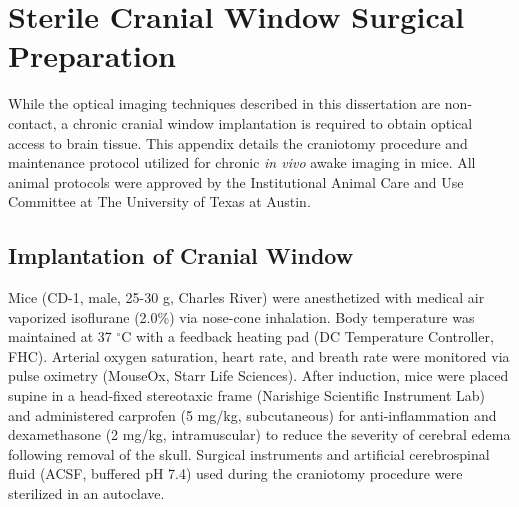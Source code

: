 
\chapter{Sterile Cranial Window Surgical Preparation} \label{app:cranial_window}

While the optical imaging techniques described in this dissertation are non-contact, a chronic cranial window implantation is required to obtain optical access to brain tissue. This appendix details the craniotomy procedure and maintenance protocol utilized for chronic \textit{in vivo} awake imaging in mice. All animal protocols were approved by the Institutional Animal Care and Use Committee at The University of Texas at Austin.


\section{Implantation of Cranial Window}

Mice (CD-1, male, 25-30 g, Charles River) were anesthetized with medical air vaporized isoflurane (2.0\%) via nose-cone inhalation. Body temperature was maintained at 37 $^\circ$C with a feedback heating pad (DC Temperature Controller, FHC). Arterial oxygen saturation, heart rate, and breath rate were monitored via pulse oximetry (MouseOx, Starr Life Sciences). After induction, mice were placed supine in a head-fixed stereotaxic frame (Narishige Scientific Instrument Lab) and administered carprofen (5 mg/kg, subcutaneous) for anti-inflammation and dexamethasone (2 mg/kg, intramuscular) to reduce the severity of cerebral edema following removal of the skull. Surgical instruments and artificial cerebrospinal fluid (ACSF, buffered pH 7.4) used during the craniotomy procedure were sterilized in an autoclave.

